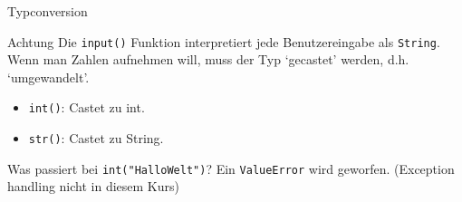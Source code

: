 \begin{frame}[fragile]{Typconversion}
    \begin{alertblock}{Achtung}
    Die \lstinline{input()} Funktion interpretiert jede Benutzereingabe
    als \texttt{String}. Wenn man Zahlen aufnehmen will, muss der Typ
    `gecastet' werden, d.h. `umgewandelt'.
    \begin{itemize}
        \item \lstinline{int()}: Castet zu int.
        \item \lstinline{str()}: Castet zu String.
    \end{itemize}
    Was passiert bei \lstinline{int("HalloWelt")}?
    \pause{}
    Ein \texttt{ValueError} wird geworfen. (Exception handling nicht 
    in diesem Kurs)
    \end{alertblock}
\end{frame}

